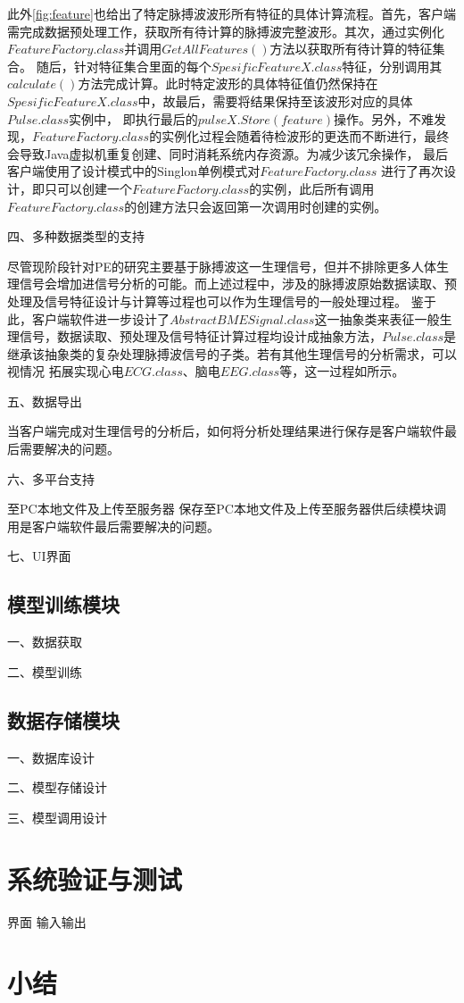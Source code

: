 此外\autoref{fig:feature}也给出了特定脉搏波波形所有特征的具体计算流程。首先，客户端需完成数据预处理工作，获取所有待计算的脉搏波完整波形。其次，通过实例化$FeatureFactory.class$并调用$GetAllFeatures()$方法以获取所有待计算的特征集合。
随后，针对特征集合里面的每个$SpesificFeatureX.class$特征，分别调用其$calculate()$方法完成计算。此时特定波形的具体特征值仍然保持在$SpesificFeatureX.class$中，故最后，需要将结果保持至该波形对应的具体$Pulse.class$实例中，
即执行最后的$pulseX.Store(feature)$操作。另外，不难发现，$FeatureFactory.class$的实例化过程会随着待检波形的更迭而不断进行，最终会导致Java虚拟机重复创建、同时消耗系统内存资源。为减少该冗余操作，
最后客户端使用了设计模式中的Singlon单例模式\cite{Li2015}对$FeatureFactory.class$
进行了再次设计，即只可以创建一个$FeatureFactory.class$的实例，此后所有调用$FeatureFactory.class$的创建方法只会返回第一次调用时创建的实例。

四、多种数据类型的支持

尽管现阶段针对PE的研究主要基于脉搏波这一生理信号，但并不排除更多人体生理信号会增加进信号分析的可能。而上述过程中，涉及的脉搏波原始数据读取、预处理及信号特征设计与计算等过程也可以作为生理信号的一般处理过程。
鉴于此，客户端软件进一步设计了$AbstractBMESignal.class$这一抽象类来表征一般生理信号，数据读取、预处理及信号特征计算过程均设计成抽象方法，$Pulse.class$是继承该抽象类的复杂处理脉搏波信号的子类。若有其他生理信号的分析需求，可以视情况
拓展实现心电$ECG.class$、脑电$EEG.class$等，这一过程如所示。

五、数据导出

当客户端完成对生理信号的分析后，如何将分析处理结果进行保存是客户端软件最后需要解决的问题。




六、多平台支持

至PC本地文件及上传至服务器
保存至PC本地文件及上传至服务器供后续模块调用是客户端软件最后需要解决的问题。

七、UI界面

\subsection{模型训练模块}
一、数据获取

二、模型训练

\subsection{数据存储模块}
一、数据库设计


二、模型存储设计

三、模型调用设计

\section{系统验证与测试}
界面
输入输出
\section{小结}